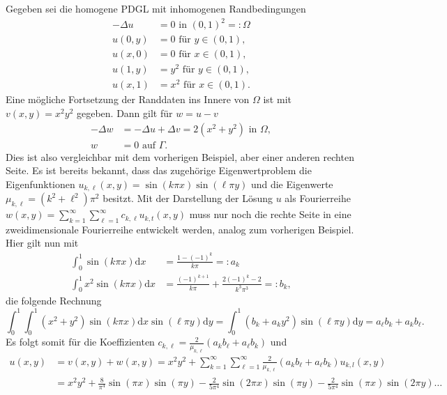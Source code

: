      	{\color{gray}Gegeben sei die homogene PDGL mit inhomogenen Randbedingungen
    	$$
    	\begin{aligned}
    		-\Delta u & =0 \text { in }(0,1)^2=: \Omega \\
    		u(0, y) & =0 \text { für } y \in(0,1), \\
    		u(x, 0) & =0 \text { für } x \in(0,1), \\
    		u(1, y) & =y^2 \text { für } y \in(0,1), \\
    		u(x, 1) & =x^2 \text { für } x \in(0,1) .
    	\end{aligned}
    	$$
    	Eine mögliche Fortsetzung der Randdaten ins Innere von $\Omega$ ist mit
    	$
    	v(x, y)=x^2 y^2
    	$
    	gegeben. Dann gilt für $w=u-v$
    	$$
    	\begin{aligned}
    		-\Delta w & =-\Delta u+\Delta v=2\left(x^2+y^2\right) \text { in } \Omega, \\
    		w & =0 \text { auf } \Gamma .
    	\end{aligned}
    	$$
    	Dies ist also vergleichbar mit dem vorherigen Beispiel, aber einer anderen rechten Seite. Es ist bereits bekannt, dass das zugehörige Eigenwertproblem die Eigenfunktionen
    	$
    	u_{k, \ell}(x, y)=\sin (k \pi x) \sin (\ell \pi y)
    	$
    	und die Eigenwerte
    	$
    	\mu_{k, \ell}=\left(k^2+\ell^2\right) \pi^2
    	$
    	besitzt. Mit der Darstellung der Lösung $u$ als Fourierreihe
    	$
    	w(x, y)=\sum\limits_{k=1}^{\infty} \sum\limits_{\ell=1}^{\infty} c_{k, \ell} u_{k, t}(x, y)
    	$
    	muss nur noch die rechte Seite in eine zweidimensionale Fourierreihe entwickelt werden, analog zum vorherigen Beispiel. Hier gilt nun mit
    	$$
    	\begin{aligned}
    		\int_{0}^{1} \sin (k \pi x) \mathrm{d} x & =\frac{1-(-1)^{k}}{k \pi}=: a_{k} \\
    		\int_{0}^{1} x^{2} \sin (k \pi x) \mathrm{d} x & =\frac{(-1)^{k+1}}{k \pi}+\frac{2(-1)^{k}-2}{k^{3} \pi^{3}}=: b_{k},
    	\end{aligned}
    	$$
    	die folgende Rechnung	
    	$$
    	\int_{0}^{1} \int_{0}^{1}\left(x^{2}+y^{2}\right) \sin (k \pi x) \mathrm{d} x \sin (\ell \pi y) \mathrm{d} y=\int_{0}^{1}\left(b_{k}+a_{k} y^{2}\right) \sin (\ell \pi y) \mathrm{d} y=a_{\ell} b_{k}+a_{k} b_{\ell} .
    	$$
    	Es folgt somit für die Koeffizienten    	
    	$
    	c_{k, \ell}=\frac{2}{\mu_{k, \ell}}\left(a_{k} b_{\ell}+a_{\ell} b_{k}\right)
    	$
    	und
    	$$
    	\begin{aligned}
    		u(x, y) & =v(x, y)+w(x, y)=x^{2} y^{2}+\sum_{k=1}^{\infty} \sum_{\ell=1}^{\infty} \frac{2}{\mu_{k, \ell}}\left(a_{k} b_{\ell}+a_{\ell} b_{k}\right) u_{k, l}(x, y) \\
    		& =x^{2} y^{2}+\frac{8}{\pi^{4}} \sin (\pi x) \sin (\pi y)-\frac{2}{5 \pi^{4}} \sin (2 \pi x) \sin (\pi y)-\frac{2}{5 \pi^{4}} \sin (\pi x) \sin (2 \pi y) \ldots
    	\end{aligned}
    	$$}
